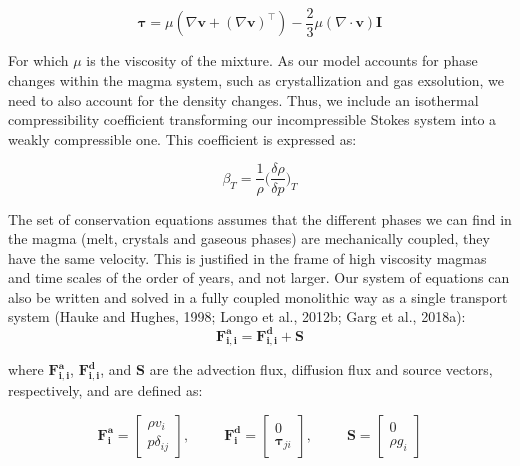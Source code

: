 \begin{equation}
	\boldsymbol{\tau} = \mu \left( \nabla \mathbf{v} + (\nabla \mathbf{v})^\top \right) - \frac{2}{3} \mu (\nabla \cdot \mathbf{v}) \mathbf{I}
\end{equation}

For which $\mu$ is the viscosity of the mixture.
As our model accounts for phase changes within the magma system, such as crystallization and gas exsolution, we need to also account for the density changes. Thus, we include an isothermal compressibility coefficient transforming our incompressible Stokes system into a weakly compressible one. This coefficient is expressed as:

\begin{equation}
	\beta_T = \frac{1}{\rho}\bigg(\frac{\delta\rho}{\delta p}\bigg)_T
\end{equation}

The set of conservation equations assumes that the different phases we can find in the magma (melt, crystals and gaseous phases) are mechanically coupled, they have the same velocity. This is justified in the frame of high viscosity magmas and time scales of the order of years, and not larger. 
Our system of equations can also be written and solved in a fully coupled monolithic way as a single transport system (Hauke and Hughes, 1998; Longo et al., 2012b; Garg et al., 2018a):
\begin{equation}
	\boldsymbol{F^{a}_{i,i}} = \boldsymbol{F^{d}_{i,i}} + \boldsymbol{S}
\end{equation}


where $\boldsymbol{F_{i,i}^{a}}$, $\boldsymbol{F_{i,i}^{d}}$, and $\boldsymbol{S}$ are the advection flux, diffusion flux and source vectors, respectively, and are defined as:

\begin{equation}
	\boldsymbol{F^{a}_{i}} = 
	\begin{bmatrix}
		\rho v_i\\
		p\delta_{ij} 
	\end{bmatrix}, ~~~~~~~~~~~
	\boldsymbol{F^{d}_{i}} = 
	\begin{bmatrix}
		0\\
		\mathbf{\tau}_{ji}
	\end{bmatrix}, ~~~~~~~~~~~
	\boldsymbol{S} =
	\begin{bmatrix}
		0\\
		\rho g_i
	\end{bmatrix}
\end{equation}

